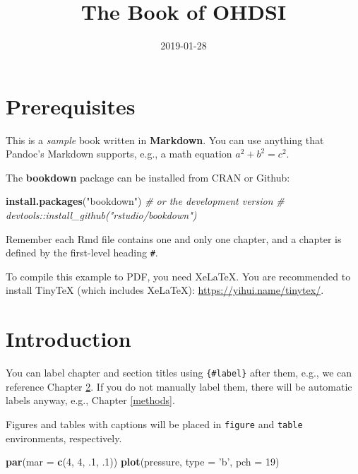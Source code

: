\documentclass[]{book}
\title{The Book of OHDSI}
\author{}
\date{2019-01-28}
\newenvironment{Shaded}{\begin{snugshade}}{\end{snugshade}}
\newcommand{\KeywordTok}[1]{\textcolor[rgb]{0.13,0.29,0.53}{\textbf{#1}}}
\newcommand{\DataTypeTok}[1]{\textcolor[rgb]{0.13,0.29,0.53}{#1}}
\newcommand{\DecValTok}[1]{\textcolor[rgb]{0.00,0.00,0.81}{#1}}
\newcommand{\StringTok}[1]{\textcolor[rgb]{0.31,0.60,0.02}{#1}}
\newcommand{\CommentTok}[1]{\textcolor[rgb]{0.56,0.35,0.01}{\textit{#1}}}
\newcommand{\NormalTok}[1]{#1}
\begin{document}
\maketitle

{
\setcounter{tocdepth}{1}
\tableofcontents
}
\chapter{Prerequisites}\label{prerequisites}

This is a \emph{sample} book written in \textbf{Markdown}. You can use
anything that Pandoc's Markdown supports, e.g., a math equation
\(a^2 + b^2 = c^2\).

The \textbf{bookdown} package can be installed from CRAN or Github:

\begin{Shaded}
\begin{Highlighting}[]
\KeywordTok{install.packages}\NormalTok{(}\StringTok{"bookdown"}\NormalTok{)}
\CommentTok{# or the development version}
\CommentTok{# devtools::install_github("rstudio/bookdown")}
\end{Highlighting}
\end{Shaded}

Remember each Rmd file contains one and only one chapter, and a chapter
is defined by the first-level heading \texttt{\#}.

To compile this example to PDF, you need XeLaTeX. You are recommended to
install TinyTeX (which includes XeLaTeX):
\url{https://yihui.name/tinytex/}.

\chapter{Introduction}\label{intro}

You can label chapter and section titles using \texttt{\{\#label\}}
after them, e.g., we can reference Chapter \ref{intro}. If you do not
manually label them, there will be automatic labels anyway, e.g.,
Chapter \ref{methods}.

Figures and tables with captions will be placed in \texttt{figure} and
\texttt{table} environments, respectively.

\begin{Shaded}
\begin{Highlighting}[]
\KeywordTok{par}\NormalTok{(}\DataTypeTok{mar =} \KeywordTok{c}\NormalTok{(}\DecValTok{4}\NormalTok{, }\DecValTok{4}\NormalTok{, .}\DecValTok{1}\NormalTok{, .}\DecValTok{1}\NormalTok{))}
\KeywordTok{plot}\NormalTok{(pressure, }\DataTypeTok{type =} \StringTok{'b'}\NormalTok{, }\DataTypeTok{pch =} \DecValTok{19}\NormalTok{)}
\end{Highlighting}
\end{Shaded}
\end{document}
